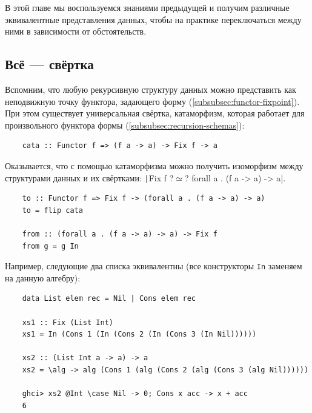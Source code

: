 В этой главе мы воспользуемся знаниями предыдущей и получим различные эквивалентные представления данных, чтобы на практике переключаться между ними в зависимости от обстоятельств.

\subsection{Всё --- свёртка} \label{subsec:all-folds}

Вспомним, что любую рекурсивную структуру данных можно представить как неподвижную точку функтора, задающего форму (\ref{subsubsec:functor-fixpoint}).
При этом существует универсальная свёртка, катаморфизм, которая работает для произвольного функтора формы (\ref{subsubsec:recursion-schemas}):
\begin{verbatim}
    cata :: Functor f => (f a -> a) -> Fix f -> a
\end{verbatim}

Оказывается, что с помощью катаморфизма можно получить изоморфизм между структурами данных и их свёртками:
\texttt|Fix f ?$\simeq$? forall a . (f a -> a) -> a|.
\begin{verbatim}
    to :: Functor f => Fix f -> (forall a . (f a -> a) -> a)
    to = flip cata

    from :: (forall a . (f a -> a) -> a) -> Fix f
    from g = g In
\end{verbatim}

Например, следующие два списка эквивалентны (все конструкторы \texttt{In} заменяем на данную алгебру):
\begin{verbatim}
    data List elem rec = Nil | Cons elem rec

    xs1 :: Fix (List Int)
    xs1 = In (Cons 1 (In (Cons 2 (In (Cons 3 (In Nil))))))

    xs2 :: (List Int a -> a) -> a
    xs2 = \alg -> alg (Cons 1 (alg (Cons 2 (alg (Cons 3 (alg Nil))))))

    ghci> xs2 @Int \case Nil -> 0; Cons x acc -> x + acc
    6
\end{verbatim}

